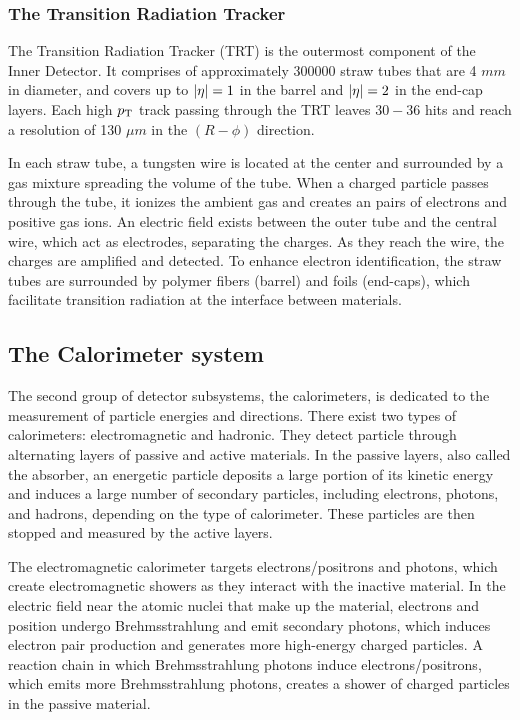 
\subsubsection{The Transition Radiation Tracker}
The Transition Radiation Tracker (TRT) is the outermost component of the Inner Detector. 
It comprises of approximately 300000 straw tubes that are 4 $mm$ in diameter, and covers up to $\abs{\eta}=1$ in the barrel and $\abs{\eta} =2$ in the end-cap layers. 
Each high $p_{\text{T}}$ track passing through the TRT leaves $30-36$ hits and reach a resolution of 130 $\mu m$ in the $(R-\phi)$ direction. 

In each straw tube, a tungsten wire is located at the center and surrounded by a gas mixture spreading the volume of the tube. 
When a charged particle passes through the tube, it ionizes the ambient gas and creates an pairs of electrons and positive gas ions. An electric field exists between the outer tube and the central wire, which act as electrodes, separating the charges. As they reach the wire, the charges are amplified and detected. To enhance electron identification, the straw tubes are surrounded by polymer fibers (barrel) and foils (end-caps), which facilitate transition radiation at the interface between materials. 

\subsection{The Calorimeter system}

The second group of detector subsystems, the calorimeters, is dedicated to the measurement of particle energies and directions. There exist two types of calorimeters: electromagnetic and hadronic. 
They detect particle through alternating layers of passive and active materials. 
In the passive layers, also called the absorber, an energetic particle deposits a large portion of its kinetic energy and induces a large number of secondary particles, including electrons, photons, and hadrons, depending on the type of calorimeter. 
These particles are then stopped and measured by the active layers. 

The electromagnetic calorimeter targets electrons/positrons and photons, which create electromagnetic showers as they interact with the inactive material. 
In the electric field near the atomic nuclei that make up the material, electrons and position undergo Brehmsstrahlung and emit secondary photons, which induces electron pair production and generates more high-energy charged particles. 
A reaction chain in which Brehmsstrahlung photons induce electrons/positrons, which emits more Brehmsstrahlung photons, creates a shower of charged particles in the passive material. 

